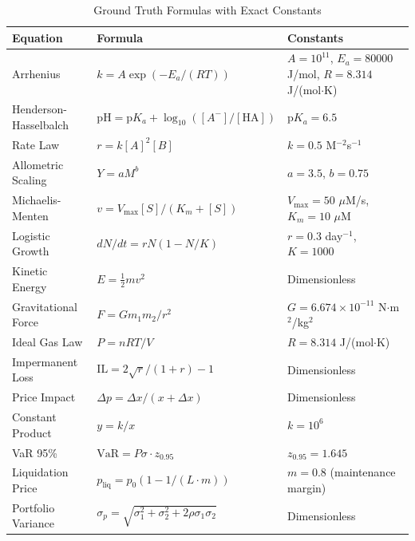 \documentclass[twoside,11pt]{article}
\begin{document}
\begin{table}[H]
\centering
\caption{Ground Truth Formulas with Exact Constants}
\label{tab:formulas_detailed}
\scriptsize
\begin{tabular}{lll}
\toprule
\textbf{Equation} & \textbf{Formula} & \textbf{Constants} \\
\midrule
Arrhenius & $k = A\exp(-E_a/(RT))$ & $A=10^{11}$, $E_a=80000$ J/mol, $R=8.314$ J/(mol$\cdot$K) \\
Henderson-Hasselbalch & $\text{pH} = \text{p}K_a + \log_{10}([A^-]/[\text{HA}])$ & $\text{p}K_a = 6.5$ \\
Rate Law & $r = k[A]^2[B]$ & $k = 0.5$ M$^{-2}$s$^{-1}$ \\
Allometric Scaling & $Y = aM^b$ & $a = 3.5$, $b = 0.75$ \\
Michaelis-Menten & $v = V_{\max}[S]/(K_m + [S])$ & $V_{\max} = 50$ $\mu$M/s, $K_m = 10$ $\mu$M \\
Logistic Growth & $dN/dt = rN(1-N/K)$ & $r = 0.3$ day$^{-1}$, $K = 1000$ \\
Kinetic Energy & $E = \frac{1}{2}mv^2$ & Dimensionless \\
Gravitational Force & $F = Gm_1m_2/r^2$ & $G = 6.674 \times 10^{-11}$ N$\cdot$m$^2$/kg$^2$ \\
Ideal Gas Law & $P = nRT/V$ & $R = 8.314$ J/(mol$\cdot$K) \\
Impermanent Loss & $\text{IL} = 2\sqrt{r}/(1+r) - 1$ & Dimensionless \\
Price Impact & $\Delta p = \Delta x/(x + \Delta x)$ & Dimensionless \\
Constant Product & $y = k/x$ & $k = 10^6$ \\
VaR 95\% & $\text{VaR} = P\sigma \cdot z_{0.95}$ & $z_{0.95} = 1.645$ \\
Liquidation Price & $p_{\text{liq}} = p_0(1 - 1/(L \cdot m))$ & $m = 0.8$ (maintenance margin) \\
Portfolio Variance & $\sigma_p = \sqrt{\sigma_1^2 + \sigma_2^2 + 2\rho\sigma_1\sigma_2}$ & Dimensionless \\
\bottomrule
\end{tabular}
\end{table}

\end{document}
